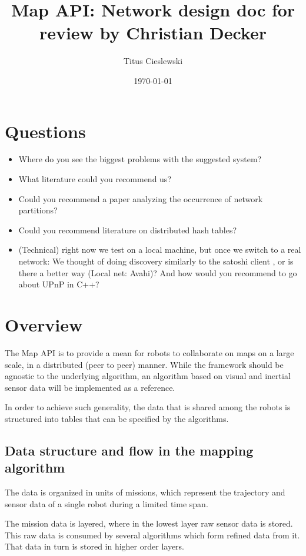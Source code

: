\documentclass[a4paper, 10pt, conference]{ieeeconf}
\title{Map API: Network design doc for review by Christian Decker}
\author{Titus Cieslewski}
\date{\today}
\begin{document}
\maketitle

\section{Questions}

\begin{itemize}
  \itemsep0em
  \item Where do you see the biggest problems with the suggested system?
  \item What literature could you recommend us?
  \item Could you recommend a paper analyzing the occurrence of network
    partitions?
  \item Could you recommend literature on distributed hash tables?
  \item (Technical) right now we test on a local machine, but once we switch to
    a real network: We thought of doing discovery similarly to the satoshi
    client \cite{discovery}, or is there a better way (Local net: Avahi)? 
    And how would you recommend to go about UPnP in C++?
\end{itemize}

\section{Overview}

The Map API is to provide a mean for robots to collaborate on maps on a large
scale, in a distributed (peer to peer) manner. While the framework should be
agnostic to the underlying algorithm, an algorithm based on visual and inertial
sensor data will be implemented as a reference.

In order to achieve such generality, the data that is shared among the robots is
structured into tables that can be specified by the algorithms.

\subsection{Data structure and flow in the mapping algorithm}

The data is organized in units of missions, which represent the trajectory and
sensor data of a single robot during a limited time span.

The mission data is layered, where in the lowest layer raw sensor data is
stored. This raw data is consumed by several algorithms which form refined data
from it. That data in turn is stored in higher order layers.
\end{document}
